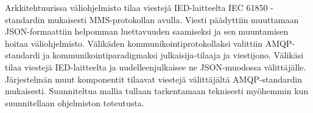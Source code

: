 Arkkitehtuurissa väliohjelmisto tilaa viestejä IED-laitteelta IEC 61850 -standardin mukaisesti MMS-protokollan avulla. Viesti päädyttiin muuttamaan JSON-formaattiin helpomman luettavuuden saamiseksi ja sen muuntamisen hoitaa väliohjelmisto. Välikäden kommunikointiprotokollaksi valittiin AMQP-standardi ja kommunikointiparadigmaksi jul\-kai\-si\-ja-ti\-laa\-ja ja viestijono. Välikäsi tilaa viestejä IED-laitteelta ja uudelleenjulkaisee ne JSON-muodossa välittäjälle. Järjestelmän muut komponentit tilaavat viestejä välittäjältä AMQP-standardin mukaisesti. Suunniteltua mallia tullaan tarkentamaan teknisesti myöhemmin kun suunnitellaan ohjelmiston toteutusta.
